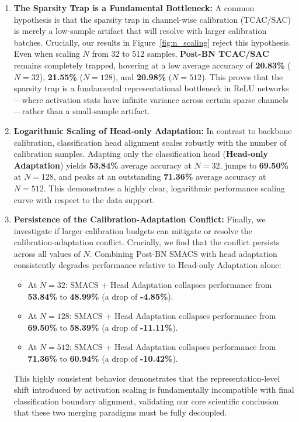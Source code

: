 \documentclass{article}
\theoremstyle{plain}
\theoremstyle{definition}
\theoremstyle{remark}
\begin{document}
\begin{enumerate}
    \item \textbf{The Sparsity Trap is a Fundamental Bottleneck:} A common hypothesis is that the sparsity trap in channel-wise calibration (TCAC/SAC) is merely a low-sample artifact that will resolve with larger calibration batches. Crucially, our results in Figure~\ref{fig:n_scaling} reject this hypothesis. Even when scaling $N$ from 32 to 512 samples, \textbf{Post-BN TCAC/SAC} remains completely trapped, hovering at a low average accuracy of \textbf{20.83\%} ($N=32$), \textbf{21.55\%} ($N=128$), and \textbf{20.98\%} ($N=512$). This proves that the sparsity trap is a fundamental representational bottleneck in ReLU networks—where activation stats have infinite variance across certain sparse channels—rather than a small-sample artifact.
    \item \textbf{Logarithmic Scaling of Head-only Adaptation:} In contrast to backbone calibration, classification head alignment scales robustly with the number of calibration samples. Adapting only the classification head (\textbf{Head-only Adaptation}) yields \textbf{53.84\%} average accuracy at $N=32$, jumps to \textbf{69.50\%} at $N=128$, and peaks at an outstanding \textbf{71.36\%} average accuracy at $N=512$. This demonstrates a highly clear, logarithmic performance scaling curve with respect to the data support.
    \item \textbf{Persistence of the Calibration-Adaptation Conflict:} Finally, we investigate if larger calibration budgets can mitigate or resolve the calibration-adaptation conflict. Crucially, we find that the conflict persists across all values of $N$. Combining Post-BN SMACS with head adaptation consistently degrades performance relative to Head-only Adaptation alone:
    \begin{itemize}
        \item At $N=32$: SMACS + Head Adaptation collapses performance from \textbf{53.84\%} to \textbf{48.99\%} (a drop of \textbf{-4.85\%}).
        \item At $N=128$: SMACS + Head Adaptation collapses performance from \textbf{69.50\%} to \textbf{58.39\%} (a drop of \textbf{-11.11\%}).
        \item At $N=512$: SMACS + Head Adaptation collapses performance from \textbf{71.36\%} to \textbf{60.94\%} (a drop of \textbf{-10.42\%}).
    \end{itemize}
    This highly consistent behavior demonstrates that the representation-level shift introduced by activation scaling is fundamentally incompatible with final classification boundary alignment, validating our core scientific conclusion that these two merging paradigms must be fully decoupled.
\end{enumerate}
\end{document}
